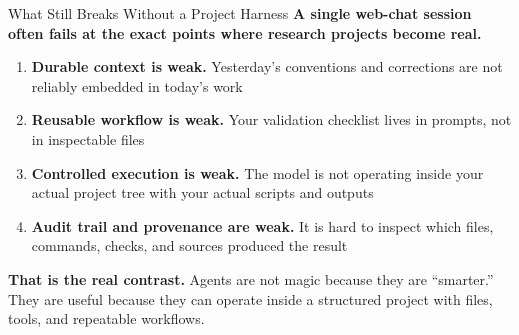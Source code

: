 \documentclass[10pt,english,aspectratio=169]{beamer}
\begin{document}
\begin{frame}{What Still Breaks Without a Project Harness}
\textbf{A single web-chat session often fails at the exact points where research projects become real.}

\vspace{0.25cm}

\begin{enumerate}
    \item \textbf{Durable context is weak.} Yesterday's conventions and corrections are not reliably embedded in today's work
    \item \textbf{Reusable workflow is weak.} Your validation checklist lives in prompts, not in inspectable files
    \item \textbf{Controlled execution is weak.} The model is not operating inside your actual project tree with your actual scripts and outputs
    \item \textbf{Audit trail and provenance are weak.} It is hard to inspect which files, commands, checks, and sources produced the result
\end{enumerate}

\vspace{0.3cm}

\textbf{That is the real contrast.} Agents are not magic because they are ``smarter.'' They are useful because they can operate inside a structured project with files, tools, and repeatable workflows.
\end{frame}
\end{document}
